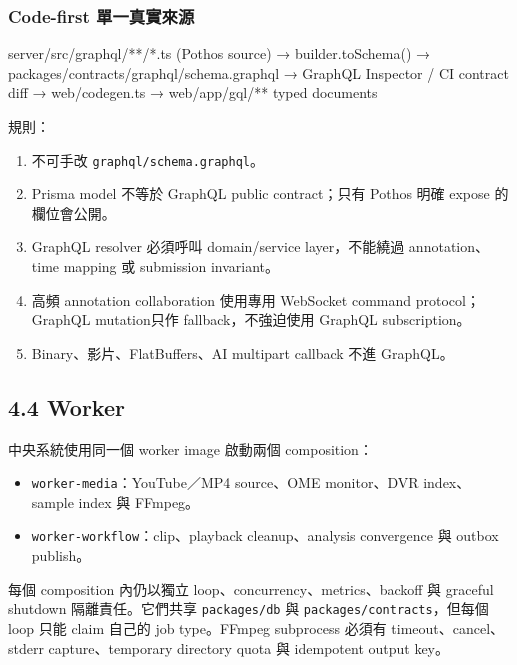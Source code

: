 \documentclass[
  9pt,
  a4paper,
]{article}
\newenvironment{Shaded}{}{}
\newcommand{\NormalTok}[1]{#1}
\providecommand{\tightlist}{%
  \setlength{\itemsep}{0pt}\setlength{\parskip}{0pt}}
\begin{document}
\subsubsection{Code-first
單一真實來源}\label{code-first-ux55aeux4e00ux771fux5be6ux4f86ux6e90}

\begin{Shaded}
\begin{Highlighting}[]
\NormalTok{server/src/graphql/**/*.ts (Pothos source)}
\NormalTok{    → builder.toSchema()}
\NormalTok{    → packages/contracts/graphql/schema.graphql}
\NormalTok{    → GraphQL Inspector / CI contract diff}
\NormalTok{    → web/codegen.ts}
\NormalTok{    → web/app/gql/** typed documents}
\end{Highlighting}
\end{Shaded}

規則：

\begin{enumerate}
\def\labelenumi{\arabic{enumi}.}
\tightlist
\item
  不可手改 \texttt{graphql/schema.graphql}。
\item
  Prisma model 不等於 GraphQL public contract；只有 Pothos 明確 expose
  的欄位會公開。
\item
  GraphQL resolver 必須呼叫 domain/service layer，不能繞過
  annotation、time mapping 或 submission invariant。
\item
  高頻 annotation collaboration 使用專用 WebSocket command
  protocol；GraphQL mutation只作 fallback，不強迫使用 GraphQL
  subscription。
\item
  Binary、影片、FlatBuffers、AI multipart callback 不進 GraphQL。
\end{enumerate}

\subsection{4.4 Worker}\label{44-worker}

中央系統使用同一個 worker image 啟動兩個 composition：

\begin{itemize}
\tightlist
\item
  \texttt{worker-media}：YouTube／MP4 source、OME monitor、DVR index、sample
  index 與 FFmpeg。
\item
  \texttt{worker-workflow}：clip、playback cleanup、analysis convergence 與
  outbox publish。
\end{itemize}

每個 composition 內仍以獨立 loop、concurrency、metrics、backoff 與
graceful shutdown 隔離責任。它們共享 \texttt{packages/db} 與
\texttt{packages/contracts}，但每個 loop 只能 claim 自己的 job
type。FFmpeg subprocess 必須有 timeout、cancel、stderr capture、temporary
directory quota 與 idempotent output key。
\end{document}
